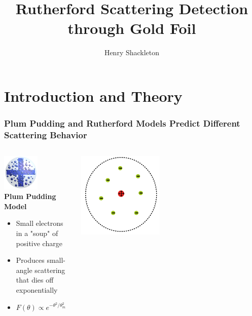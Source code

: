 \documentclass{beamer}
\title[Rutherford Scattering]{Rutherford Scattering Detection through Gold Foil}
\author{Henry Shackleton}
\begin{document}
\titlepage

\section{Introduction and Theory}

\begin{frame}
  \frametitle{Plum Pudding and Rutherford Models Predict Different Scattering Behavior}
  \begin{columns}
    \begin{column}{0.5\textwidth}
      \begin{center}
      \includegraphics[width=0.5\textwidth]{plum}
      \\
      \textbf{Plum Pudding Model}
      \begin{itemize}
        \pause
        \item Small electrons in a "soup" of positive charge
          \pause
        \item Produces small-angle scattering that dies off exponentially
          \pause
        \item $F(\theta) \propto e^{-\theta^2/\theta_m^2}$
          \pause
      \end{itemize}
    \end{center}
    \end{column}
    \begin{column}{0.5\textwidth}
      \begin{center}
      \item
        \vspace{-20pt}
      \includegraphics[width=0.44\textwidth]{rutherford.png}

\end{center}
\end{column}
\end{columns}
\end{frame}
\end{document}
